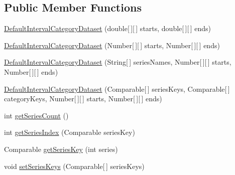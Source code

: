 \subsection*{Public Member Functions}
\begin{DoxyCompactItemize}
\item 
\mbox{\hyperlink{classorg_1_1jfree_1_1data_1_1category_1_1_default_interval_category_dataset_adb601ae0645988be67a5eab831434621}{Default\+Interval\+Category\+Dataset}} (double\mbox{[}$\,$\mbox{]}\mbox{[}$\,$\mbox{]} starts, double\mbox{[}$\,$\mbox{]}\mbox{[}$\,$\mbox{]} ends)
\item 
\mbox{\hyperlink{classorg_1_1jfree_1_1data_1_1category_1_1_default_interval_category_dataset_aa00fee2391edf2649fc2427c3f896d45}{Default\+Interval\+Category\+Dataset}} (Number\mbox{[}$\,$\mbox{]}\mbox{[}$\,$\mbox{]} starts, Number\mbox{[}$\,$\mbox{]}\mbox{[}$\,$\mbox{]} ends)
\item 
\mbox{\hyperlink{classorg_1_1jfree_1_1data_1_1category_1_1_default_interval_category_dataset_a3057d475ae9675290e58db33d37ae4ce}{Default\+Interval\+Category\+Dataset}} (String\mbox{[}$\,$\mbox{]} series\+Names, Number\mbox{[}$\,$\mbox{]}\mbox{[}$\,$\mbox{]} starts, Number\mbox{[}$\,$\mbox{]}\mbox{[}$\,$\mbox{]} ends)
\item 
\mbox{\hyperlink{classorg_1_1jfree_1_1data_1_1category_1_1_default_interval_category_dataset_a464ae5fb59542a3e3f2dfb98c9e4aba9}{Default\+Interval\+Category\+Dataset}} (Comparable\mbox{[}$\,$\mbox{]} series\+Keys, Comparable\mbox{[}$\,$\mbox{]} category\+Keys, Number\mbox{[}$\,$\mbox{]}\mbox{[}$\,$\mbox{]} starts, Number\mbox{[}$\,$\mbox{]}\mbox{[}$\,$\mbox{]} ends)
\item 
int \mbox{\hyperlink{classorg_1_1jfree_1_1data_1_1category_1_1_default_interval_category_dataset_a78f53d6f3fd5af45da391c7473385ced}{get\+Series\+Count}} ()
\item 
int \mbox{\hyperlink{classorg_1_1jfree_1_1data_1_1category_1_1_default_interval_category_dataset_a11d3a851909daca3a6a279611a7151ba}{get\+Series\+Index}} (Comparable series\+Key)
\item 
Comparable \mbox{\hyperlink{classorg_1_1jfree_1_1data_1_1category_1_1_default_interval_category_dataset_a1004c0e577d9e3b1edc6651bf97fd45a}{get\+Series\+Key}} (int series)
\item 
void \mbox{\hyperlink{classorg_1_1jfree_1_1data_1_1category_1_1_default_interval_category_dataset_a4ef4aa17006e0e137e632498435d0482}{set\+Series\+Keys}} (Comparable\mbox{[}$\,$\mbox{]} series\+Keys)
\item 

\end{DoxyCompactItemize}
